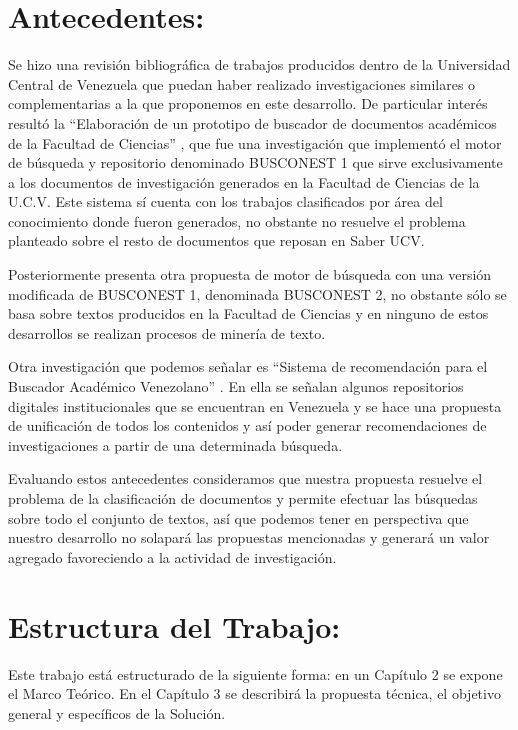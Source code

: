 \documentclass[
  10,
  openany]{book}
\begin{document}
\hypertarget{antecedentes}{%
\section{Antecedentes:}\label{antecedentes}}

Se hizo una revisión bibliográfica de trabajos producidos dentro de la Universidad Central de Venezuela que puedan haber realizado investigaciones similares o complementarias a la que proponemos en este desarrollo. De particular interés resultó la ``Elaboración de un prototipo de buscador de documentos académicos de la Facultad de Ciencias'' \citep{Sánchez2008}, que fue una investigación que implementó el motor de búsqueda y repositorio denominado BUSCONEST 1 que sirve exclusivamente a los documentos de investigación generados en la Facultad de Ciencias de la U.C.V. Este sistema sí cuenta con los trabajos clasificados por área del conocimiento donde fueron generados, no obstante no resuelve el problema planteado sobre el resto de documentos que reposan en Saber UCV.

Posteriormente \citep{guevara2015} presenta otra propuesta de motor de búsqueda con una versión modificada de BUSCONEST 1, denominada BUSCONEST 2, no obstante sólo se basa sobre textos producidos en la Facultad de Ciencias y en ninguno de estos desarrollos se realizan procesos de minería de texto.

Otra investigación que podemos señalar es ``Sistema de recomendación para el Buscador Académico Venezolano'' \citep{rodríguezlaguna2016}. En ella se señalan algunos repositorios digitales institucionales que se encuentran en Venezuela y se hace una propuesta de unificación de todos los contenidos y así poder generar recomendaciones de investigaciones a partir de una determinada búsqueda.

Evaluando estos antecedentes consideramos que nuestra propuesta resuelve el problema de la clasificación de documentos y permite efectuar las búsquedas sobre todo el conjunto de textos, así que podemos tener en perspectiva que nuestro desarrollo no solapará las propuestas mencionadas y generará un valor agregado favoreciendo a la actividad de investigación.

\hypertarget{estructura}{%
\section{Estructura del Trabajo:}\label{estructura}}

Este trabajo está estructurado de la siguiente forma: en un Capítulo 2 se expone el Marco Teórico. En el Capítulo 3 se describirá la propuesta técnica, el objetivo general y específicos de la Solución.
\end{document}
